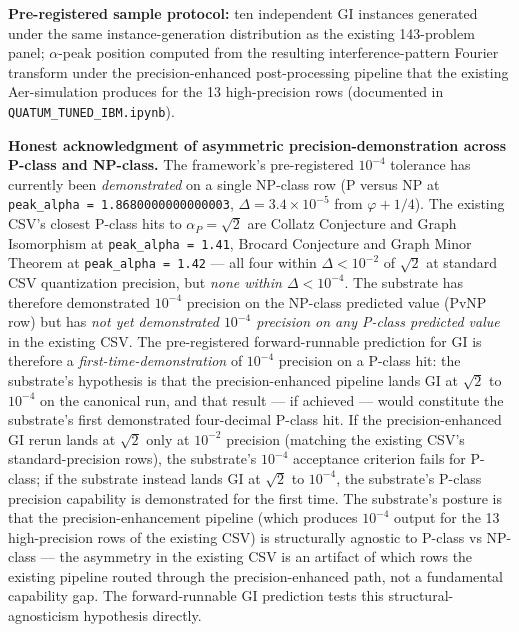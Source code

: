 \documentclass[11pt,a4paper]{amsart}
\theoremstyle{plain}
\theoremstyle{definition}
\begin{document}
\textbf{Pre-registered sample protocol:} ten independent GI instances generated under the same instance-generation distribution as the existing 143-problem panel; $\alpha$-peak position computed from the resulting interference-pattern Fourier transform under the precision-enhanced post-processing pipeline that the existing Aer-simulation produces for the 13 high-precision rows (documented in \texttt{QUATUM\_TUNED\_IBM.ipynb}).

\textbf{Honest acknowledgment of asymmetric precision-demonstration across P-class and NP-class.} The framework's pre-registered $10^{-4}$ tolerance has currently been \emph{demonstrated} on a single NP-class row (P versus NP at \texttt{peak\_alpha = 1.8680000000000003}, $\Delta = 3.4 \times 10^{-5}$ from $\varphi + 1/4$). The existing CSV's closest P-class hits to $\alpha_{P} = \sqrt{2}$ are Collatz Conjecture and Graph Isomorphism at \texttt{peak\_alpha = 1.41}, Brocard Conjecture and Graph Minor Theorem at \texttt{peak\_alpha = 1.42} --- all four within $\Delta < 10^{-2}$ of $\sqrt{2}$ at standard CSV quantization precision, but \emph{none within $\Delta < 10^{-4}$}. The substrate has therefore demonstrated $10^{-4}$ precision on the NP-class predicted value (PvNP row) but has \emph{not yet demonstrated $10^{-4}$ precision on any P-class predicted value} in the existing CSV. The pre-registered forward-runnable prediction for GI is therefore a \emph{first-time-demonstration} of $10^{-4}$ precision on a P-class hit: the substrate's hypothesis is that the precision-enhanced pipeline lands GI at $\sqrt{2}$ to $10^{-4}$ on the canonical run, and that result --- if achieved --- would constitute the substrate's first demonstrated four-decimal P-class hit. If the precision-enhanced GI rerun lands at $\sqrt{2}$ only at $10^{-2}$ precision (matching the existing CSV's standard-precision rows), the substrate's $10^{-4}$ acceptance criterion fails for P-class; if the substrate instead lands GI at $\sqrt{2}$ to $10^{-4}$, the substrate's P-class precision capability is demonstrated for the first time. The substrate's posture is that the precision-enhancement pipeline (which produces $10^{-4}$ output for the 13 high-precision rows of the existing CSV) is structurally agnostic to P-class vs NP-class --- the asymmetry in the existing CSV is an artifact of which rows the existing pipeline routed through the precision-enhanced path, not a fundamental capability gap. The forward-runnable GI prediction tests this structural-agnosticism hypothesis directly.
\end{document}
